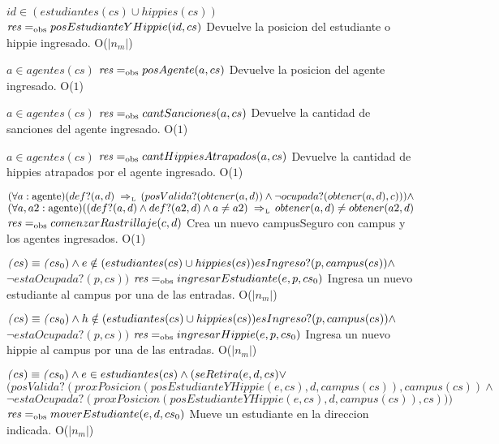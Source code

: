  {$id \in (estudiantes(cs) \cup hippies(cs))$}
 {$\text{\textit{res}} =_{\mathrm{obs}} posEstudianteYHippie(id, cs)$}
 {Devuelve la posicion del estudiante o hippie ingresado.}
 {O($|n_m|$)}
 {}

 {$a \in agentes(cs)$}
 {$\text{\textit{res}} =_{\mathrm{obs}} posAgente(a, cs)$}
 {Devuelve la posicion del agente ingresado.}
 {O($1$)}
 {}
 
 {$a \in agentes(cs)$}
 {$\text{\textit{res}} =_{\mathrm{obs}} cantSanciones(a, cs)$}
 {Devuelve la cantidad de sanciones del agente ingresado.}
 {O($1$)}
 {}
 
 {$a \in agentes(cs)$}
 {$\text{\textit{res}} =_{\mathrm{obs}} cantHippiesAtrapados(a, cs)$}
 {Devuelve la cantidad de hippies atrapados por el agente ingresado.}
 {O($1$)}
 {}
 

{$(\paratodo{agente}{a})(def?(a, d) \impluego (posValida?(obtener(a, d)) \land \neg ocupada?(obtener(a, d), c))) \land $\\$ (\paratodo{agente}{a, a2}) ((def?(a, d) \land def?(a2, d) \land a \neq a2) \impluego obtener(a, d) \neq obtener(a2, d)$}
{$\text{\textit{res}} =_{\mathrm{obs}} comenzarRastrillaje(c, d)$}
{Crea un nuevo campusSeguro con campus y los agentes ingresados.}
{O($1$)}
{}
 
{$\text{\textit{(}}cs) \equiv \text{\textit{(}}cs_0) \land e \notin (estudiantes(cs) \cup hippies(cs)) esIngreso?(p, campus(cs)) \land $\\$\neg estaOcupada?(p, cs))$}
{$\text{\textit{res}} =_{\mathrm{obs}} ingresarEstudiante(e, p, cs_0)$}
{Ingresa un nuevo estudiante al campus por una de las entradas.}
{O($|n_m|$)}
{}

{$\text{\textit{(}}cs) \equiv \text{\textit{(}}cs_0) \land h \notin (estudiantes(cs) \cup hippies(cs)) esIngreso?(p, campus(cs)) \land $\\$\neg estaOcupada?(p, cs))$}
{$\text{\textit{res}} =_{\mathrm{obs}} ingresarHippie(e, p, cs_0)$}
{Ingresa un nuevo hippie al campus por una de las entradas.}
{O($|n_m|$)}
{}

{$\text{\textit{(}}cs) \equiv \text{\textit{(}}cs_0) \land e \in estudiantes(cs) \land (seRetira(e, d, cs) \lor $\\$ (posValida?(proxPosicion(posEstudianteYHippie(e, cs), d, campus(cs)), campus(cs)) \land $\\$ \neg estaOcupada?(proxPosicion(posEstudianteYHippie(e, cs), d, campus(cs)), cs)))$}
{$\text{\textit{res}} =_{\mathrm{obs}} moverEstudiante(e, d, cs_0)$}
{Mueve un estudiante en la direccion indicada.}
{O($|n_m|$)}
{}

